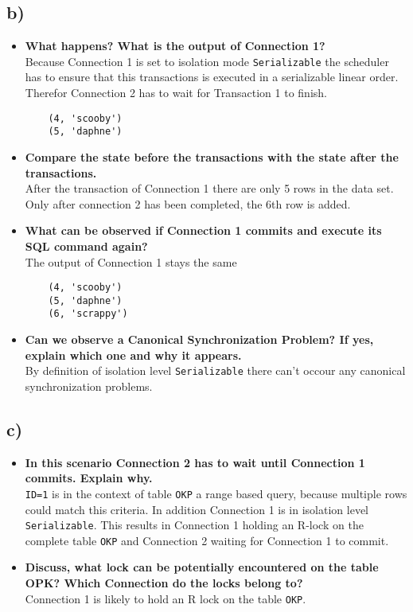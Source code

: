 \documentclass[a4paper,english,abstract=on]{scrartcl}
\begin{document}
\subsection*{b)}
	\begin{itemize}
		\item \textbf{What happens? What is the output of Connection 1?}\\
	Because Connection 1 is set to isolation mode \texttt{Serializable} the scheduler has to ensure that this transactions is executed in a serializable linear order. Therefor Connection 2 has to wait for Transaction 1 to finish. 
	\begin{lstlisting}
	(4, 'scooby')
	(5, 'daphne')
	\end{lstlisting}
	\item \textbf{Compare the state before the transactions with the state after the transactions.}\\
	After the transaction of Connection 1 there are only 5 rows in the data set. Only after connection 2 has been completed, the 6th row is added.
	\item \textbf{What can be observed if Connection 1 commits and execute its SQL command again?}\\
	The output of Connection 1 stays the same
	\begin{lstlisting}
	(4, 'scooby')
	(5, 'daphne')
	(6, 'scrappy')
	\end{lstlisting}
	\item \textbf{Can we observe a Canonical Synchronization Problem? If yes, explain which one and why it appears.}\\
	By definition of isolation level \texttt{Serializable} there can't occour any canonical synchronization problems.
\end{itemize}

\subsection*{c)}
\begin{itemize}
	\item \textbf{In this scenario Connection 2 has to wait until Connection 1 commits. Explain why.}\\
	\texttt{ID=1} is in the context of table \texttt{OKP} a range based query, because multiple rows could match this criteria. In addition Connection 1 is in isolation level \texttt{Serializable}. This results in Connection 1 holding an R-lock on the complete table \texttt{OKP} and Connection 2 waiting for Connection 1 to commit.
	\item \textbf{Discuss, what lock can be potentially encountered on the table OPK? Which Connection do the locks belong to?}\\
	Connection 1 is likely to hold an R lock on the table \texttt{OKP}.
\end{itemize}
\end{document}
